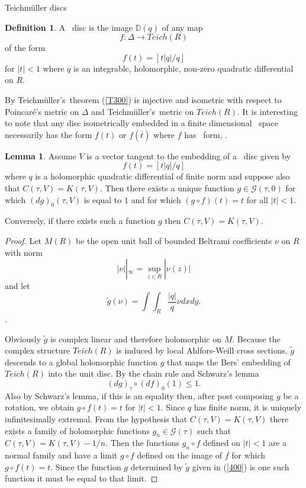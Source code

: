 \documentclass[12pt]{amsart}
\newcommand{\tes}{Teich\-m\"ul\-ler's}
\theoremstyle{remark}
\theoremstyle{definition}
\newtheorem{definition}{Definition}
\theoremstyle{definition}
\newtheorem{lemma}{Lemma}
\begin{document}
\begin{section}{Teichm\"uller discs}

   \begin{definition}\label{tdisc}
   A \te\ disc is the image ${\mathbb D}(q)$ of any map $$f: \Delta \rightarrow Teich(R)$$ of the form \begin{equation}\label{T300} 
   f(t)=[t|q|/q]
   \end{equation}
    for $|t|<1$ where $q$ is an integrable, holomorphic, non-zero quadratic differential on 
   $R.$   
   \end{definition}
   
   By \tes\ theorem (\ref{T300}) is injective and isometric with respect to Poincar\'e's metric on $\Delta$ 
   and \tes\ metric on $Teich(R).$
    It is interesting to note that any disc isometrically embedded in a finite dimensional \te\ space necessarily has the form $f(t)$ or $f(\overline{t})$ where $f$ has \te\ form, \cite{Antonakoudis}.
    
  
   

   
    \begin{lemma}\label{ONE}Assume $V$ is a vector  tangent to the embedding of a \te\ disc given by $$f(t) = [t|q|/q]$$ where $q$ is a holomorphic quadratic differential of finite norm and suppose
    also that $C(\tau,V)=K(\tau,V).$ Then
    there exists a unique function $g \in {\mathcal G}({\tau},0)$   for which $(dg)_0(\tau,V)$ is equal to $1$ and  
 for which $(g \circ f)(t)=t$ for all $|t|<1.$ 
 
 Conversely, if there exists such a function $g$ then $C(\tau,V)=K(\tau,V).$
  \end{lemma}
 \begin{proof} Let $M(R)$ be the open unit ball of bounded Beltrami coefficients $\nu$ on $R$  with norm $$|\nu||_{\infty} = \sup_{z \in R} |\nu(z)|$$
 and let \begin{equation}\label{400}\tilde{g}(\nu)= \int \! \int_R \frac{|q|}{q}\nu dx dy .\end{equation}.
 
 Obviously $\tilde{g}$ is complex linear and therefore holomorphic on $M.$  Because the complex structure
 $Teich(R)$  is induced by local Ahlfors-Weill cross sections, $\tilde{g}$ descends to a global holomorphic function $g$ that maps the Bers' embedding of $Teich(R)$ into the unit disc.  
  By the chain rule and Schwarz's lemma
 $$(dg)_{\tau} \circ (df)_{0}(1)\leq 1.$$
 Also by Schwarz's lemma, if this is an equality then, after post composing $g$ be a rotation, we obtain  $g \circ f (t)=t$ for $|t|<1.$  Since $q$ has finite norm, it is uniquely infinitesimally extremal.  From the hypothesis that $C(\tau,V)=K(\tau,V)$ there exists a family of holomorphic functions 
 $g_n \in {\mathcal G}(\tau)$ such that $C(\tau,V)=K(\tau,V) - 1/n.$  Then the functions  $g_n \circ f$ defined on $|t|<1$ are a normal family and have a limit $g \circ f$  defined on the image of $f$ for which  
 $g \circ f (t)=t.$  Since the function $g$ determined by  $\tilde{g}$ given in (\ref{400}) is one such function it must be equal to that limit. 
 

\end{proof}
\end{section}
\end{document}
